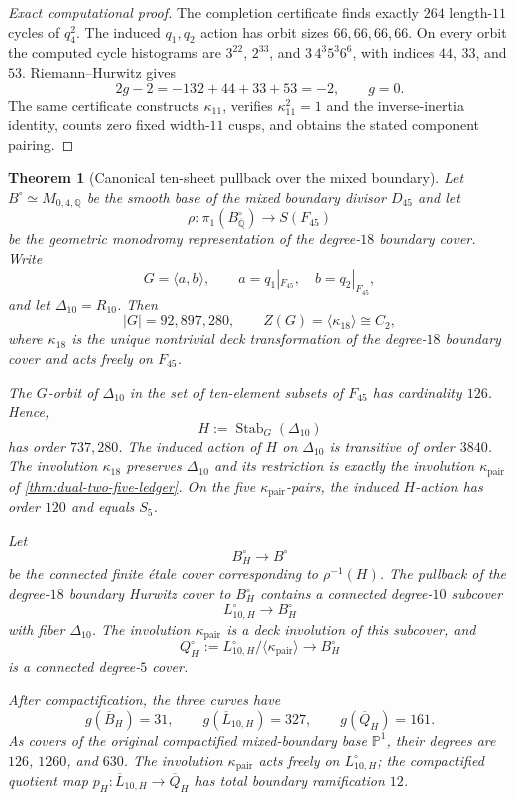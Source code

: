 \documentclass[11pt]{article}
\newtheorem{theorem}{Theorem}[section]
\theoremstyle{remark}
\newcommand{\Q}{\mathbb Q}
\begin{document}
\begin{proof}[Exact computational proof]
The completion certificate finds exactly $264$ length-$11$ cycles of $q_4^2$.  The induced $q_1,q_2$ action has orbit sizes $66,66,66,66$.  On every orbit the computed cycle histograms are $3^{22}$, $2^{33}$, and $3\,4^3 5^3 6^6$, with indices $44$, $33$, and $53$.  Riemann--Hurwitz gives
\[
 2g-2=-132+44+33+53=-2,
 \qquad
 g=0.
\]
The same certificate constructs $\kappa_{11}$, verifies $\kappa_{11}^2=1$ and the inverse-inertia identity, counts zero fixed width-$11$ cusps, and obtains the stated component pairing.
\end{proof}

\begin{theorem}[Canonical ten-sheet pullback over the mixed boundary]
\label{thm:canonical-ten-pullback}
Let $B^\circ\simeq M_{0,4,\Q}$ be the smooth base of the mixed boundary divisor $D_{45}$ and let
\[
 \rho:\pi_1(B^\circ_{\overline{\Q}})\longrightarrow S(F_{45})
\]
be the geometric monodromy representation of the degree-$18$ boundary cover.  Write
\[
 G=\langle a,b\rangle,
 \qquad a=q_1|_{F_{45}},\quad b=q_2|_{F_{45}},
\]
and let $\Delta_{10}=R_{10}$.  Then
\[
 |G|=92{,}897{,}280,
 \qquad
 Z(G)=\langle\kappa_{18}\rangle\cong C_2,
\]
where $\kappa_{18}$ is the unique nontrivial deck transformation of the degree-$18$ boundary cover and acts freely on $F_{45}$.

The $G$-orbit of $\Delta_{10}$ in the set of ten-element subsets of $F_{45}$ has cardinality $126$.  Hence,
\[
 H:=\operatorname{Stab}_G(\Delta_{10})
\]
has order $737{,}280$.  The induced action of $H$ on $\Delta_{10}$ is transitive of order $3840$.  The involution $\kappa_{18}$ preserves $\Delta_{10}$ and its restriction is exactly the involution $\kappa_{\mathrm{pair}}$ of \cref{thm:dual-two-five-ledger}.  On the five $\kappa_{\mathrm{pair}}$-pairs, the induced $H$-action has order $120$ and equals $S_5$.

Let
\[
 B_H^\circ\longrightarrow B^\circ
\]
be the connected finite \'etale cover corresponding to $\rho^{-1}(H)$.  The pullback of the degree-$18$ boundary Hurwitz cover to $B_H^\circ$ contains a connected degree-$10$ subcover
\[
 L_{10,H}^\circ\longrightarrow B_H^\circ
\]
with fiber $\Delta_{10}$.  The involution $\kappa_{\mathrm{pair}}$ is a deck involution of this subcover, and
\[
 Q_H^\circ:=L_{10,H}^\circ/\langle\kappa_{\mathrm{pair}}\rangle
 \longrightarrow B_H^\circ
\]
is a connected degree-$5$ cover.

After compactification, the three curves have
\[
 \boxed{
 g(\overline B_H)=31,
 \qquad
 g(\overline L_{10,H})=327,
 \qquad
 g(\overline Q_H)=161.
 }
\]
As covers of the original compactified mixed-boundary base $\mathbb P^1$, their degrees are $126$, $1260$, and $630$.  The involution $\kappa_{\mathrm{pair}}$ acts freely on $L_{10,H}^\circ$; the compactified quotient map $p_H:\overline L_{10,H}\to\overline Q_H$ has total boundary ramification $12$.
\end{theorem}
\end{document}
